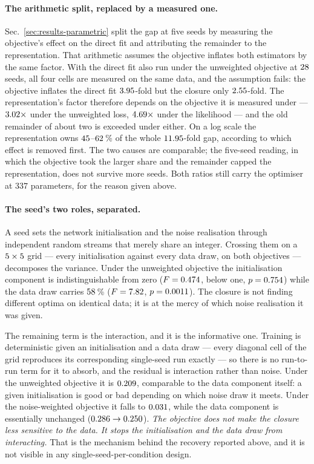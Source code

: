 \documentclass{article}
\newcommand{\NparamUde}{337}   %
\begin{document}
\paragraph{The arithmetic split, replaced by a measured one.}
Sec.~\ref{sec:results-parametric} split the gap at five seeds by measuring the
objective's effect on the direct fit and attributing the remainder to the
representation. That arithmetic assumes the objective inflates both estimators by
the same factor. With the direct fit also run under the unweighted objective at
$28$ seeds, all four cells are measured on the same data, and the
assumption fails: the objective inflates the direct fit $3.95$-fold but
the closure only $2.55$-fold. The representation's factor therefore
depends on the objective it is measured under --- $3.02\times$ under the
unweighted loss, $4.69\times$ under the likelihood --- and the old
remainder of about two is exceeded under either. On a log scale the representation
owns $45$--$62$\,\% of the whole
$11.95$-fold gap, according to which effect is removed first. The two
causes are comparable; the five-seed reading, in which the objective took the
larger share and the remainder capped the representation, does not survive more
seeds. Both ratios still carry the optimiser at $\NparamUde$ parameters, for the
reason given above.

\paragraph{The seed's two roles, separated.}
A seed sets the network initialisation and the noise realisation through
independent random streams that merely share an integer. Crossing them on a
$5 \times 5$ grid --- every initialisation against every data
draw, on both objectives --- decomposes the variance. Under the unweighted
objective the initialisation component is indistinguishable from zero
($F = 0.474$, below one, $p = 0.754$) while the data draw
carries $58$\,\% ($F = 7.82$, $p = 0.0011$). The
closure is not finding different optima on identical data; it is at the mercy of
which noise realisation it was given.

The remaining term is the interaction, and it is the informative one. Training is
deterministic given an initialisation and a data draw --- every diagonal cell of
the grid reproduces its corresponding single-seed run exactly --- so there is no
run-to-run term for it to absorb, and the residual is interaction rather than
noise. Under the unweighted objective it is $0.209$, comparable to
the data component itself: a given initialisation is good or bad depending on
which noise draw it meets. Under the noise-weighted objective it falls to
$0.031$, while the data component is essentially unchanged
($0.286 \rightarrow 0.250$). \emph{The objective does not
make the closure less sensitive to the data. It stops the initialisation and the
data draw from interacting.} That is the mechanism behind the recovery reported
above, and it is not visible in any single-seed-per-condition design.
\end{document}
